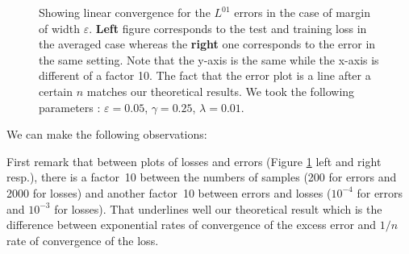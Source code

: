 \begin{figure}[ht]
\footnotesize
{}%
\hspace{1cm}%
%
\caption{ \small Showing linear convergence for the $L^{01}$ errors in the case of margin of width $\varepsilon$. {\bfseries Left} figure corresponds to the test and training loss in the averaged case whereas the {\bfseries right} one corresponds to the error in the same setting. Note that the y-axis is the same while the x-axis is different of a factor 10. The fact that the error plot is a line after a certain $n$ matches our theoretical results. We took the following parameters :  $\varepsilon = 0.05$, $\gamma = 0.25$, $\lambda = 0.01$.}
\label{fig:plots}
\end{figure}
%
We can make the following observations:

First remark that between plots of losses and errors (Figure \ref{fig:plots} left and right resp.), there is a factor~10 between the numbers of samples (200 for errors and 2000 for losses) and another factor~10 between errors and losses ($10^{-4}$ for errors and $10^{-3}$ for losses). That underlines well our theoretical result which is the difference between exponential rates of convergence of the excess error and $1/n$ rate of convergence of the loss.


